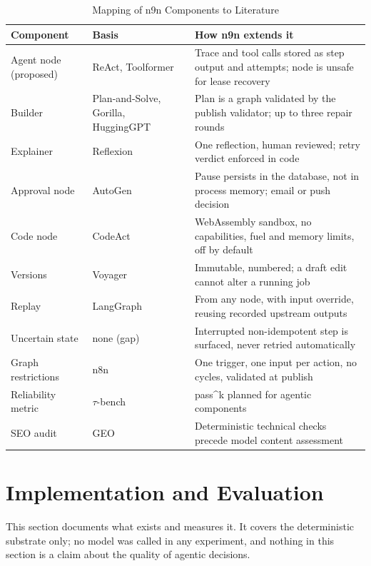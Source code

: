 \documentclass[conference]{IEEEtran}
\begin{document}
\begin{table}[!htbp]
\centering
\caption{Mapping of n9n Components to Literature}
\label{tab:map}
\small
\begin{tabular}{L{1.7cm} L{1.5cm} L{4.1cm}}
\toprule
\textbf{Component} & \textbf{Basis} & \textbf{How n9n extends it} \\
\midrule
Agent node (proposed) & ReAct, Toolformer & Trace and tool calls stored as step output and attempts; node is unsafe for lease recovery \\
Builder & Plan-and-Solve, Gorilla, HuggingGPT & Plan is a graph validated by the publish validator; up to three repair rounds \\
Explainer & Reflexion & One reflection, human reviewed; retry verdict enforced in code \\
Approval node & AutoGen & Pause persists in the database, not in process memory; email or push decision \\
Code node & CodeAct & WebAssembly sandbox, no capabilities, fuel and memory limits, off by default \\
Versions & Voyager & Immutable, numbered; a draft edit cannot alter a running job \\
Replay & LangGraph & From any node, with input override, reusing recorded upstream outputs \\
Uncertain state & none (gap) & Interrupted non-idempotent step is surfaced, never retried automatically \\
Graph restrictions & n8n & One trigger, one input per action, no cycles, validated at publish \\
Reliability metric & $\tau$-bench & pass\^{}k planned for agentic components \\
SEO audit & GEO & Deterministic technical checks precede model content assessment \\
\bottomrule
\end{tabular}
\end{table}
\section{Implementation and Evaluation}
This section documents what exists and measures it. It covers the deterministic substrate only; no model was called in any experiment, and nothing in this section is a claim about the quality of agentic decisions.
\end{document}

